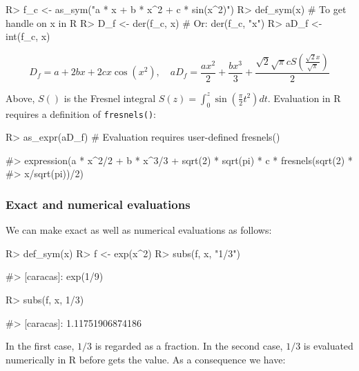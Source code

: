 \begin{Schunk}
\begin{Sinput}
R> f_c <- as_sym("a * x + b * x^2 + c * sin(x^2)")
R> def_sym(x) # To get handle on x in R
R> D_f <- der(f_c, x) # Or: der(f_c, "x")
R> aD_f <- int(f_c, x) %
\end{Sinput}
\end{Schunk}

\[
D_f = a + 2 b x + 2 c x \cos{\left(x^{2} \right)}, \quad aD_f = \frac{a x^{2}}{2} + \frac{b x^{3}}{3} + \frac{\sqrt{2} \sqrt{\pi} c S\left(\frac{\sqrt{2} x}{\sqrt{\pi}}\right)}{2}
\]

Above, \(S()\) is the Fresnel integral
\(S(z) = \int_0^z \sin \left (\frac{\pi}{2}t^2 \right ) dt\). Evaluation
in R requires a definition of \texttt{fresnels()}:

\begin{Schunk}
\begin{Sinput}
R> as_expr(aD_f) # Evaluation requires user-defined fresnels()
\end{Sinput}
\begin{Soutput}
#> expression(a * x^2/2 + b * x^3/3 + sqrt(2) * sqrt(pi) * c * fresnels(sqrt(2) * 
#>     x/sqrt(pi))/2)
\end{Soutput}
\end{Schunk}

\hypertarget{exact-and-numerical-evaluations}{%
\subsubsection{Exact and numerical
evaluations}\label{exact-and-numerical-evaluations}}

We can make exact as well as numerical evaluations as follows:

\begin{Schunk}
\begin{Sinput}
R> def_sym(x)
R> f <- exp(x^2)
R> subs(f, x, "1/3")
\end{Sinput}
\begin{Soutput}
#> [caracas]: exp(1/9)
\end{Soutput}
\begin{Sinput}
R> subs(f, x, 1/3)
\end{Sinput}
\begin{Soutput}
#> [caracas]: 1.11751906874186
\end{Soutput}
\end{Schunk}

In the first case, \(1/3\) is regarded as a fraction. In the second
case, \(1/3\) is evaluated numerically in R before 
gets the value. As a consequence we have:

